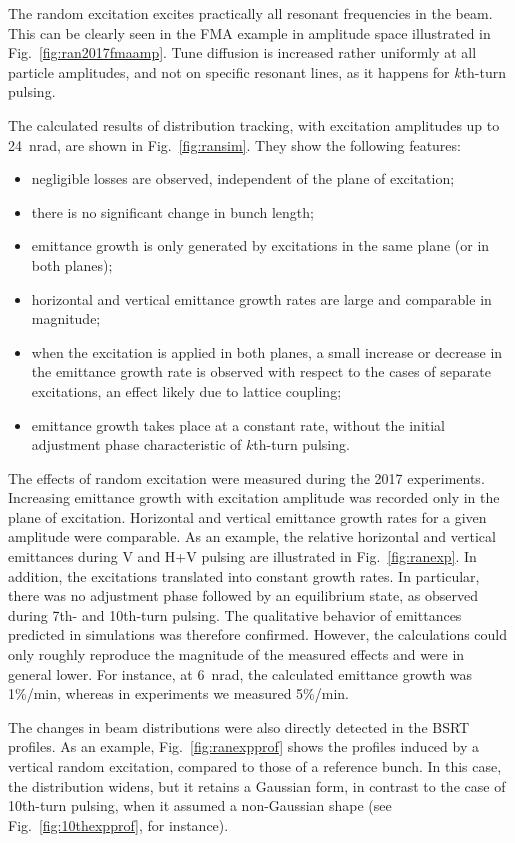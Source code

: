 \documentclass[
prstab
,reprint
,linenumbers
,longbibliography
,preprintnumbers
,showkeys
,amsfonts,amssymb,amsmath
,floatfix
]{revtex4-1}
\newcommand{\kthtp}{$k$th-turn pulsing}
\newcommand{\tenthtp}{10th-turn pulsing}
\begin{document}
The random excitation excites practically all resonant frequencies in
the beam.  This can be clearly seen in the FMA example in amplitude
space illustrated in Fig.~\ref{fig:ran2017fmaamp}. Tune diffusion is
increased rather uniformly at all particle amplitudes, and not on
specific resonant lines, as it happens for \kthtp.


The calculated results of distribution tracking, with excitation
amplitudes up to 24~nrad, are shown in
Fig.~\ref{fig:ransim}. They show the following features:
%
\begin{itemize}
\item negligible losses are observed, independent of the plane of
  excitation;
\item there is no significant change in bunch length;
\item emittance growth is only generated by excitations in the same
  plane (or in both planes);
\item horizontal and vertical emittance growth rates are large and
  comparable in magnitude;
\item when the excitation is applied in both planes, a small increase
  or decrease in the emittance growth rate is observed with respect to
  the cases of separate excitations, an effect likely due to lattice
  coupling;
\item emittance growth takes place at a constant rate, without the
  initial adjustment phase characteristic of \kthtp.
\end{itemize}

The effects of random excitation were measured during the 2017
experiments. Increasing emittance growth with excitation amplitude was
recorded only in the plane of excitation. Horizontal and vertical
emittance growth rates for a given amplitude were comparable. As an
example, the relative horizontal and vertical emittances during V and
H+V pulsing are illustrated in Fig.~\ref{fig:ranexp}. In addition, the
excitations translated into constant growth rates. In particular,
there was no adjustment phase followed by an equilibrium state, as
observed during 7th- and \tenthtp. The qualitative behavior of
emittances predicted in simulations was therefore confirmed. However,
the calculations could only roughly reproduce the magnitude of the
measured effects and were in general lower. For instance, at 6~nrad,
the calculated emittance growth was 1\%/min, whereas in experiments we
measured 5\%/min.

The changes in beam distributions were also directly detected in the
BSRT profiles. As an example, Fig.~\ref{fig:ranexpprof} shows the
profiles induced by a vertical random excitation, compared to those of
a reference bunch. In this case, the distribution widens, but it
retains a Gaussian form, in contrast to the case of \tenthtp, when it
assumed a non-Gaussian shape (see Fig.~\ref{fig:10thexpprof}, for
instance).
\end{document}
